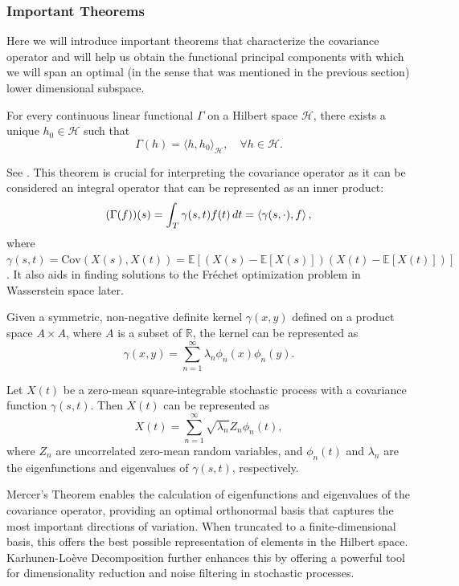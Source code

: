 \subsubsection{Important Theorems}
\label{sec:theorems}
Here we will introduce important theorems that characterize the covariance operator
and will help us obtain the functional principal components with which we will span
an optimal (in the sense that was mentioned in the previous section) lower dimensional subspace.
\begin{theorem}
    \label{th:riesz}
    For every continuous linear functional \(\Gamma\) on a Hilbert space \(\mathcal{H}\), there
    exists a unique \(h_0 \in \mathcal{H}\) such that
    \[
        \Gamma(h) = \langle h, h_0 \rangle_{\mathcal{H}}, \quad \forall h \in \mathcal{H}.
    \]
\end{theorem}
See \Textcite[Chapter~1, \S 3]{Conway2007}. This theorem is crucial for interpreting the
covariance operator as it can be considered an integral operator that can be represented
as an inner product:
\begin{equation}
    (\Gamma(f))(s) = \int_{T} \gamma(s, t) f(t) \, dt = \left \langle \gamma(s, \cdot), f \right \rangle,
\end{equation}
where $\gamma(s, t) = \text{Cov}(X(s), X(t)) = \mathbb{E}[(X(s) - \mathbb{E}[X(s)])(X(t) - \mathbb{E}[X(t)])]$.
It also aids in finding solutions to the Fréchet optimization problem in Wasserstein space
later.

\begin{theorem}
Given a symmetric, non-negative definite kernel \(\gamma(x, y)\) defined on a product space
\(A \times A\), where \(A\) is a subset of \(\mathbb{R}\), the kernel can be represented
as
\[
    \gamma(x, y) = \sum_{n=1}^{\infty} \lambda_n \phi_n(x) \phi_n(y).
\]
\end{theorem}
\begin{theorem}
Let \(X(t)\) be a zero-mean square-integrable stochastic process with a covariance
function \(\gamma(s, t)\). Then \(X(t)\) can be represented as
\[
    X(t) = \sum_{n=1}^{\infty} \sqrt{\lambda_n} Z_n \phi_n(t),
\]
where \(Z_n\) are uncorrelated zero-mean random variables, and \(\phi_n(t)\) and
\(\lambda_n\) are the eigenfunctions and eigenvalues of \(\gamma(s, t)\), respectively.
\end{theorem}
Mercer's Theorem enables the calculation of eigenfunctions and eigenvalues of the
covariance operator, providing an optimal orthonormal basis that captures the most
important directions of variation. When truncated to a finite-dimensional basis, this
offers the best possible representation of elements in the Hilbert space. Karhunen-Loève
Decomposition further enhances this by offering a powerful tool for dimensionality
reduction and noise filtering in stochastic processes.

